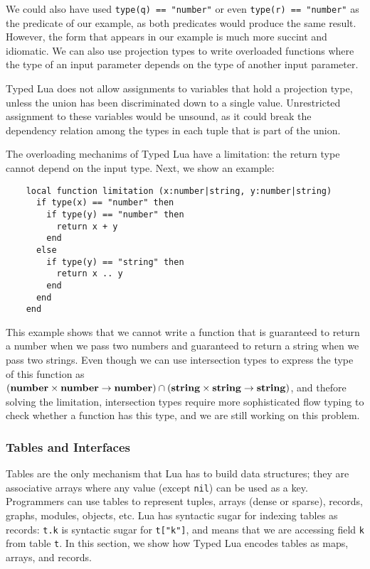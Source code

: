We could also have used \texttt{type(q) == "number"} or
even \texttt{type(r) == "number"} as the predicate of our example,
as both predicates would produce the same result.
However, the form that appears in our example is much more succint and idiomatic.
We can also use projection types to write overloaded functions where
the type of an input parameter depends on the type of another input parameter.

Typed Lua does not allow assignments to variables that hold a projection type,
unless the union has been discriminated down to a single value.
Unrestricted assignment to these variables would be unsound,
as it could break the dependency relation among the types in each tuple
that is part of the union.

The overloading mechanims of Typed Lua have a limitation:
the return type cannot depend on the input type.
Next, we show an example:
\begin{verbatim}
    local function limitation (x:number|string, y:number|string)
      if type(x) == "number" then
        if type(y) == "number" then
          return x + y
        end
      else
        if type(y) == "string" then
          return x .. y
        end
      end
    end
\end{verbatim}

This example shows that we cannot write a function that is
guaranteed to return a number when we pass two numbers and
guaranteed to return a string when we pass two strings.
Even though we can use intersection types to express the type
of this function as
$(\mathbf{number} \times \mathbf{number} \rightarrow \mathbf{number}) \cap (\mathbf{string} \times \mathbf{string} \rightarrow \mathbf{string})$,
and thefore solving the limitation,
intersection types require more sophisticated flow typing to
check whether a function has this type,
and we are still working on this problem.

\subsubsection{Tables and Interfaces}

Tables are the only mechanism that Lua has to build data structures;
they are associative arrays where any value (except \texttt{nil})
can be used as a key.
Programmers can use tables to represent tuples, arrays (dense or sparse),
records, graphs, modules, objects, etc.
Lua has syntactic sugar for indexing tables as records:
\texttt{t.k} is syntactic sugar for \texttt{t["k"]}, and means that
we are accessing field \texttt{k} from table \texttt{t}. 
In this section, we show how Typed Lua encodes tables as maps,
arrays, and records.

